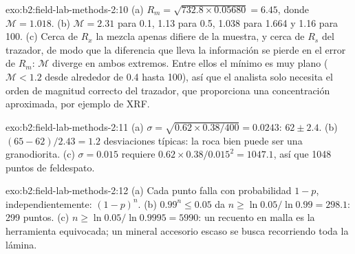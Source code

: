 \begin{solution}{exo:b2:field-lab-methods-2:10}
(a) $R_m = \sqrt{732.8 \times 0.05680} = 6.45$, donde $\mathcal M = 1.018$. (b) $\mathcal M = 2.31$
para 0.1, 1.13 para 0.5, 1.038 para 1.664 y 1.16 para 100. (c) Cerca de $R_x$ la mezcla apenas difiere de
la muestra, y cerca de $R_s$ del trazador, de modo que la diferencia que lleva la información se pierde en
el error de $R_m$: $\mathcal M$ diverge en ambos extremos. Entre ellos el mínimo es muy plano
($\mathcal M < 1.2$ desde alrededor de 0.4 hasta 100), así que el analista solo necesita el orden de magnitud correcto
del trazador, que proporciona una concentración aproximada, por ejemplo de XRF.
\end{solution}

\begin{solution}{exo:b2:field-lab-methods-2:11}
(a) $\sigma = \sqrt{0.62 \times 0.38/400} = 0.0243$: $62 \pm 2.4$. (b) $(65 - 62)/2.43 = 1.2$
desviaciones típicas: la roca bien puede ser una granodiorita. (c) $\sigma = 0.015$ requiere $0.62 \times
0.38/0.015^2 = 1047.1$, así que 1048 puntos de feldespato.
\end{solution}

\begin{solution}{exo:b2:field-lab-methods-2:12}
(a) Cada punto falla con probabilidad $1 - p$, independientemente: $(1-p)^n$. (b) $0.99^n \le 0.05$
da $n \ge \ln 0.05/\ln 0.99 = 298.1$: 299 puntos. (c) $n \ge \ln 0.05/\ln 0.9995 = 5990$: un recuento en malla
es la herramienta equivocada; un mineral accesorio escaso se busca recorriendo toda la lámina.
\end{solution}

